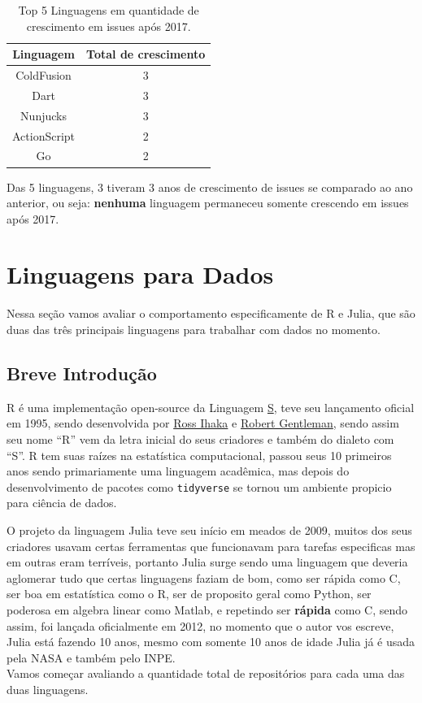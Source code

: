 \documentclass[
  letterpaper,
  DIV=11,
  numbers=noendperiod]{scrartcl}
\begin{document}
\begin{table}[H]
\centering
\begin{tabular}[t]{c|c}
\hline
Linguagem & Total de crescimento\\
\hline
ColdFusion & 3\\
\hline
Dart & 3\\
\hline
Nunjucks & 3\\
\hline
ActionScript & 2\\
\hline
Go & 2\\
\hline
\end{tabular}
\caption{Top 5 Linguagens em quantidade de crescimento em issues após 2017.}
\end{table}

Das 5 linguagens, 3 tiveram 3 anos de crescimento de issues se comparado
ao ano anterior, ou seja: \textbf{nenhuma} linguagem permaneceu somente
crescendo em issues após 2017.

\section{Linguagens para Dados}

Nessa seção vamos avaliar o comportamento especificamente de R e Julia,
que são duas das três principais linguagens para trabalhar com dados no
momento.

\subsection{Breve Introdução}

R é uma implementação open-source da Linguagem
\href{https://en.wikipedia.org/wiki/S_(programming_language)}{S}, teve
seu lançamento oficial em 1995, sendo desenvolvida por
\href{https://en.wikipedia.org/wiki/Ross_Ihaka}{Ross Ihaka} e
\href{https://en.wikipedia.org/wiki/Robert_Gentleman_(statistician)}{Robert
Gentleman}, sendo assim seu nome ``R'' vem da letra inicial do seus
criadores e também do dialeto com ``S''. R tem suas raízes na
estatística computacional, passou seus 10 primeiros anos sendo
primariamente uma linguagem acadêmica, mas depois do desenvolvimento de
pacotes como \texttt{tidyverse} se tornou um ambiente propicio para
ciência de dados.

O projeto da linguagem Julia teve seu início em meados de 2009, muitos
dos seus criadores usavam certas ferramentas que funcionavam para
tarefas especificas mas em outras eram terríveis, portanto Julia surge
sendo uma linguagem que deveria aglomerar tudo que certas linguagens
faziam de bom, como ser rápida como C, ser boa em estatística como o R,
ser de proposito geral como Python, ser poderosa em algebra linear como
Matlab, e repetindo ser \textbf{rápida} como C, sendo assim, foi lançada
oficialmente em 2012, no momento que o autor vos escreve, Julia está
fazendo 10 anos, mesmo com somente 10 anos de idade Julia já é usada
pela NASA e também pelo INPE.\\
Vamos começar avaliando a quantidade total de repositórios para cada uma
das duas linguagens.
\end{document}
